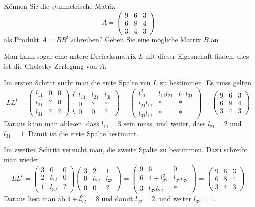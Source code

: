 Können Sie die symmetrische Matrix
\[
A=\begin{pmatrix}
9&6&3\\
6&8&4\\
3&4&3
\end{pmatrix}
\]
als Produkt $A=BB^t$ schreiben? Geben Sie eine mögliche Matrix $B$ an.


\begin{loesung}
Man kann sogar eine untere Dreiecksmatrix $L$ mit dieser Eigesnchaft finden,
dies ist die Cholesky-Zerlegung von $A$.

Im ersten Schritt sucht man die erste Spalte von $L$ zu bestimmen.
Es muss gelten
\[
LL^t=
\begin{pmatrix}
l_{11}&  0&  0\\
l_{21}&  ?&  0\\
l_{31}&  ?&  ?
\end{pmatrix}
\begin{pmatrix}
l_{11}&l_{21}&l_{31}\\
     0&     ?&     ?\\
     0&     0&     ?
\end{pmatrix}
=
\begin{pmatrix}
    l_{11}^2&l_{11}l_{21}&l_{11}l_{31}\\
l_{21}l_{11}&           *&           *\\
l_{31}l_{11}&           *&           *
\end{pmatrix}
=
\begin{pmatrix}
9&6&3\\
6&8&4\\
3&4&3
\end{pmatrix}
\]
Daraus kann man ablesen, dass $l_{11}=3$ sein muss, und weiter,
dass
$l_{21}=2$ und $l_{31}=1$. Damit ist die erste Spalte bestimmt.

Im zweiten Schritt versucht man, die zweite Spalte zu bestimmen.
Dazu schreibt man wieder
\[
LL^t
=
\begin{pmatrix}
3&     0&0\\
2&l_{22}&0\\
1&l_{32}&?
\end{pmatrix}
\begin{pmatrix}
3&     2&     1\\
0&l_{22}&l_{32}\\
0&     0&?
\end{pmatrix}
=
\begin{pmatrix}
9&6           &           0\\
6&4+l_{22}^2  &l_{22}l_{32}\\
3&l_{32}l_{22}&         *
\end{pmatrix}
=
\begin{pmatrix}
9&6&3\\
6&8&4\\
3&4&3
\end{pmatrix}
\]
Daraus liest man ab $4+l_{22}^2=8$ und damit $l_{22}=2$, und weiter
$l_{32}=1$.


\end{loesung}
